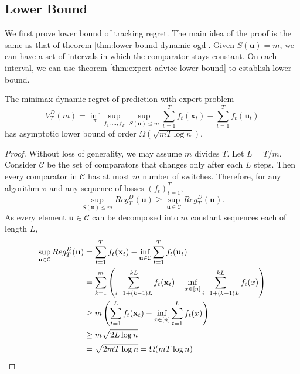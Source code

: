 \documentclass[12pt, a4paper]{report}
\begin{document}
\subsection{Lower Bound}
We first prove lower bound of tracking regret. The main idea of the proof is the same as that of theorem \ref{thm:lower-bound-dynamic-ogd}. Given $S(\mathbf{u}) = m$, we can have a set of intervals in which the comparator stays constant. On each interval, we can use theorem \ref{thm:expert-advice-lower-bound} to establish lower bound.
\begin{prop}\label{prop:pred-dynamic-lower-bound}
The minimax dynamic regret of prediction with expert problem 
\begin{equation*}
    V_T^D(m) = \inf_\pi \sup_{f_1, \dots, f_T} \sup_{S(\mathbf{u}) \leq m} \sum_{t=1}^T f_t(\mathbf{x}_t) - \sum_{t=1}^T f_t(\mathbf{u}_t)
\end{equation*}
has asymptotic lower bound of order $\Omega(\sqrt{m T \log n})$.
\end{prop}
\begin{proof}
Without loss of generality, we may assume $m$ divides $T$. Let $L = T / m$. Consider $\mathcal{C}$ be the set of comparators that changes only after each $L$ steps. Then every comparator in $\mathcal{C}$ has at most $m$ number of switches. Therefore, for any algorithm $\pi$ and any sequence of losses $(f_t)_{t=1}^T$, 
\begin{equation*}
    \sup_{S(\mathbf{u}) \leq m} Reg_T^D(\mathbf{u}) \geq \sup_{\mathbf{u} \in \mathcal{C}} Reg_T^D(\mathbf{u}).
\end{equation*}
As every element $\mathbf{u} \in \mathcal{C}$ can be decomposed into $m$ constant sequences each of length $L$,
\begin{align*}
    \sup_{\mathbf{u} \in \mathcal{C}} Reg_T^D(\mathbf{u}) &= \sum_{t=1}^T f_t(\mathbf{x}_t) - \inf_{\mathbf{u} \in \mathcal{C}} \sum_{t=1}^T f_t(\mathbf{u}_t)
    \\
    &= \sum_{k=1}^m \left(\sum_{i = 1 + (k-1)L}^{k L} f_t(\mathbf{x}_t) - \inf_{x \in [n]} \sum_{i=1 + (k-1)L}^{kL} f_t(x) \right)
    \\
    &\geq m \left(\sum_{t=1}^L f_t(\mathbf{x}_t) - \inf_{x \in [n]} \sum_{t=1}^L f_t(x) \right)
    \\
    &\geq m \sqrt{2L \log n} 
    \\
    &= \sqrt{2 mT \log n} = \Omega(m T \log n) \qedhere
\end{align*}
\end{proof}
\end{document}
